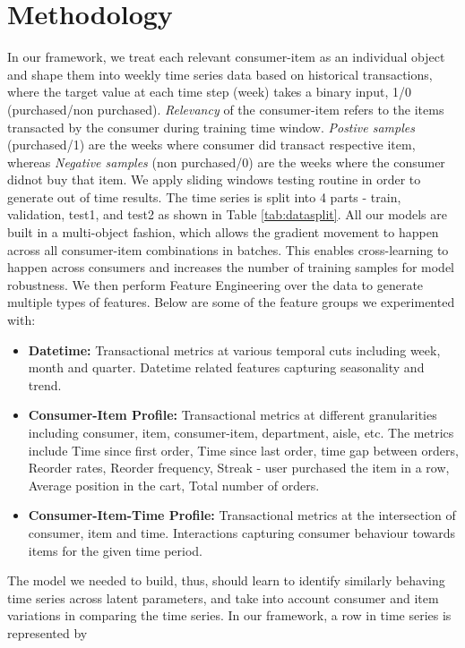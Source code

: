 \section{Methodology}
\label{sec:methodology}
In our framework, we treat each relevant consumer-item as an individual object and shape them into weekly time series data
based on historical transactions, where the target value at each time step (week) takes a binary input, 1/0 
(purchased/non purchased). \emph{Relevancy} of the consumer-item refers to the items transacted by the consumer during training 
time window. \emph{Postive samples} (purchased/1) are the weeks where consumer did transact respective item, whereas 
\emph{Negative samples} (non purchased/0) are the weeks where the consumer didnot buy that item.
We apply sliding windows testing routine in order to generate 
out of time results. The time series is split into 4 parts - train, validation, 
test1, and test2 as shown in Table \ref{tab:datasplit}. All our models are built in a multi-object 
fashion, which allows the gradient movement to happen across all consumer-item combinations in batches. This enables 
cross-learning to happen across consumers and increases the number of training samples for model 
robustness. We then perform Feature Engineering over the data to generate multiple types of features. 
Below are some of the feature groups we experimented with:
\begin{itemize}
\item {\bf Datetime:} Transactional metrics at various temporal cuts including week, month and quarter. 
Datetime related features capturing seasonality and trend.
\item {\bf Consumer-Item Profile:} Transactional metrics at different granularities including consumer, item,
consumer-item, department, aisle, etc. The metrics include Time since first order, 
Time since last order, time gap between orders, Reorder rates, Reorder frequency, 
Streak - user purchased the item in a row, Average position in the cart, Total number of orders.
\item {\bf Consumer-Item-Time Profile:} Transactional metrics at the intersection of consumer, item and time.
Interactions capturing consumer behaviour towards items for the given time period.
\end{itemize}
The model we needed to build, thus, should learn to identify similarly behaving time series across latent
parameters, and take into account consumer and item variations in comparing the time series. In our framework, a row 
in time series is represented by
